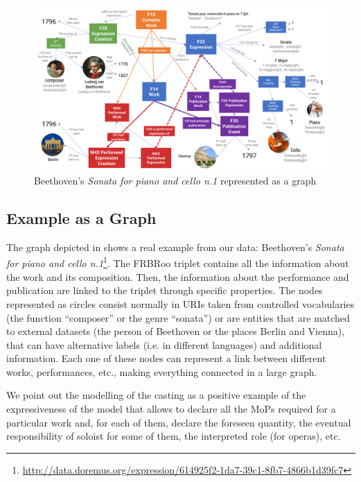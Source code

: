 \begin{figure}
 \centerline{
 \includegraphics[width=\textwidth]{figs/schema_2.png}}
 \caption{Beethoven's \textit{Sonata for piano and cello n.1} represented as a graph}
 \label{fig:schema}
\end{figure}

\subsection{Example as a Graph}
The graph depicted in  shows a real example from our data: Beethoven's \textit{Sonata for piano and cello n.1}\footnote{\url{http://data.doremus.org/expression/614925f2-1da7-39c1-8fb7-4866b1d39fc7}}. The FRBRoo triplet contains all the information about the work and its composition. Then, the information about the performance and publication are linked to the triplet through specific properties. The nodes represented as circles consist normally in URIs taken from controlled vocabularies (the function ``composer'' or the genre ``sonata'') or are entities that are matched to external datasets (the person of Beethoven or the places Berlin and Vienna), that can have alternative labels (i.e. in different languages) and additional information. Each one of these nodes can represent a link between different works, performances, etc., making everything connected in a large graph.

We point out the modelling of the casting as a positive example of the expressiveness of the model that allows to declare all the MoPs required for a particular work and, for each of them, declare the foreseen quantity, the eventual responsibility of soloist for some of them, the interpreted role (for operas), etc.

